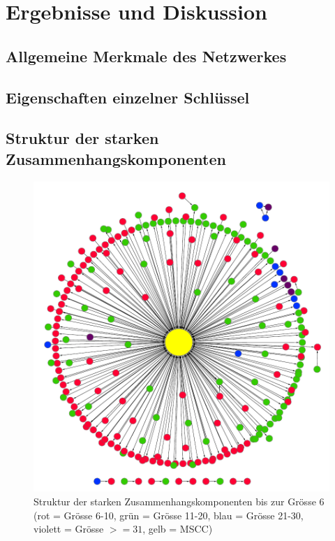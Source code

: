 
\chapter{Ergebnisse und Diskussion}
\label{ch:Ergebnisse}

\section{Allgemeine Merkmale des Netzwerkes}
\label{sec:result-allg-merkm-des}

\section{Eigenschaften einzelner Schl\"ussel}
\label{sec:result-key-properties}

\section{Struktur der starken Zusammenhangskomponenten}
\label{sec:result-komponentenstruktur}

\begin{figure}[h]
  \centering
  \includegraphics[scale=1.0]{images/component-metagraph-8.pdf}
  \caption{Struktur der starken Zusammenhangskomponenten bis zur
    Grösse 6 (rot = Grösse 6-10, grün = Grösse 11-20, blau = Grösse
    21-30, violett = Grösse $>= 31$, gelb = MSCC)}
  \label{fig:komponenten-struktur}
\end{figure}

